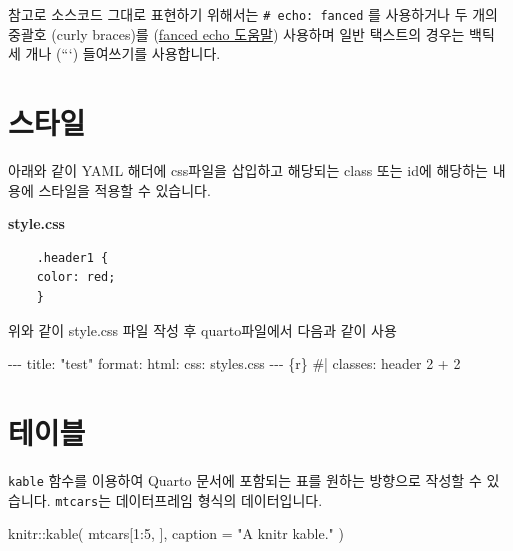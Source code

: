 \documentclass[
  a4paper,
]{book}
\newenvironment{Shaded}{\begin{snugshade}}{\end{snugshade}}
\newcommand{\AttributeTok}[1]{\textcolor[rgb]{0.40,0.45,0.13}{#1}}
\newcommand{\DecValTok}[1]{\textcolor[rgb]{0.68,0.00,0.00}{#1}}
\newcommand{\FunctionTok}[1]{\textcolor[rgb]{0.28,0.35,0.67}{#1}}
\newcommand{\InformationTok}[1]{\textcolor[rgb]{0.37,0.37,0.37}{#1}}
\newcommand{\NormalTok}[1]{\textcolor[rgb]{0.00,0.23,0.31}{#1}}
\newcommand{\SpecialCharTok}[1]{\textcolor[rgb]{0.37,0.37,0.37}{#1}}
\newcommand{\StringTok}[1]{\textcolor[rgb]{0.13,0.47,0.30}{#1}}
\begin{document}
참고로 소스코드 그대로 표현하기 위해서는
\texttt{\#\textbar{}\ echo:\ fanced} 를 사용하거나 두 개의 중괄호 (curly
braces)를
(\href{https://quarto.org/docs/computations/execution-options.html\#fenced-echo}{fanced
echo 도움말}) 사용하며 일반 택스트의 경우는 백틱 세 개나 (```)
들여쓰기를 사용합니다.

\hypertarget{uxc2a4uxd0c0uxc77c}{%
\section{스타일}\label{uxc2a4uxd0c0uxc77c}}

아래와 같이 YAML 해더에 css파일을 삽입하고 해당되는 class 또는 id에
해당하는 내용에 스타일을 적용할 수 있습니다.

\textbf{style.css}

\begin{verbatim}
    .header1 {
    color: red;
    }
\end{verbatim}

위와 같이 style.css 파일 작성 후 quarto파일에서 다음과 같이 사용

\begin{Shaded}
\begin{Highlighting}[]
\InformationTok{    {-}{-}{-}}
\InformationTok{    title: "test"}
\InformationTok{    format:}
\InformationTok{      html:}
\InformationTok{        css: styles.css}
\InformationTok{    {-}{-}{-}}
\InformationTok{    }
\InformationTok{    \textasciigrave{}\textasciigrave{}\textasciigrave{}\{r\}}
\InformationTok{    \#| classes: header}
\InformationTok{    }
\InformationTok{    2 + 2}
\InformationTok{    \textasciigrave{}\textasciigrave{}\textasciigrave{}}
\end{Highlighting}
\end{Shaded}

\hypertarget{uxd14cuxc774uxbe14}{%
\section{테이블}\label{uxd14cuxc774uxbe14}}

\texttt{kable} 함수를 이용하여 Quarto 문서에 포함되는 표를 원하는
방향으로 작성할 수 있습니다. \texttt{mtcars}는 데이터프레임 형식의
데이터입니다.

\begin{Shaded}
\begin{Highlighting}[]
\NormalTok{knitr}\SpecialCharTok{::}\FunctionTok{kable}\NormalTok{(}
\NormalTok{  mtcars[}\DecValTok{1}\SpecialCharTok{:}\DecValTok{5}\NormalTok{, ], }
  \AttributeTok{caption =} \StringTok{"A knitr kable."}
\NormalTok{)}
\end{Highlighting}
\end{Shaded}
\end{document}
